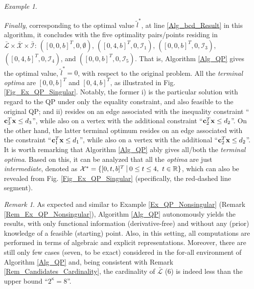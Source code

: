 \documentclass[9pt,twocolumn,twoside,lineno]{pnas-new-1}
\newcommand{\bfc}{{\bf c}}
\newcommand{\bfx}{{\bf x}}
\newcommand{\real}{\mathbb{R}}
\newcommand{\calI}{{\mathcal I}}
\newcommand{\calL}{{\mathcal L}}
\newcommand{\calX}{{\mathcal X}}
\theoremstyle{remark}
\newtheorem{remark}{Remark}[section]
\newtheorem{example}{Example}[section]
\begin{document}
\begin{example}
\begin{enumerate}
\end{enumerate}

\textit{Finally}, corresponding to the optimal value $\tilde l^*$, at line \ref{Alg_bcd_Result} in this algorithm, it concludes with the five optimality pairs/points residing in $\bar\calL\times\bar\calX\times\bar\calI$: $([0,0,b]^T,0,\emptyset)$, $([0,4,b]^T,0,\calI_1)$, $([0,0,b]^T,0,\calI_3)$, $([0,4,b]^T,0,\calI_4)$, and $([0,0,b]^T,0,\calI_5)$. That is, Algorithm \ref{Alg_QP} gives the optimal value, $\tilde l^*=0$, with respect to the original problem. All the \textit{terminal optima} are $[0,0,b]^T$ and $[0,4,b]^T$, as illustrated in Fig. \ref{Fig_Ex_QP_Singular}. Notably, the former i) is the particular solution with regard to the QP under only the equality constraint, and also feasible to the original QP; and ii) resides on an edge associated with the inequality constraint ``$\bfc_3^T\bfx\le d_3$'', while also on a vertex with the additional constraint ``$\bfc_2^T\bfx\le d_2$''. On the other hand, the latter terminal optimum resides on an edge associated with the constraint ``$\bfc_1^T\bfx\le d_1$'', while also on a vertex with the additional ``$\bfc_2^T\bfx\le d_2$''. It is worth remarking that Algorithm \ref{Alg_QP} ably gives all/both the \textit{terminal optima}. Based on this, it can be analyzed that all the \textit{optima} are just \textit{intermediate}, denoted as $\calX^*=\{[0,t,b]^T~\vrule~0\le t\le 4,~t\in\real\}$, which can also be revealed from Fig. \ref{Fig_Ex_QP_Singular} (specifically, the red-dashed line segment).

\begin{remark}
As expected and similar to Example \ref{Ex_QP_Nonsingular} (Remark \ref{Rem_Ex_QP_Nonsingular}), Algorithm \ref{Alg_QP} autonomously yields the results, with only functional information (derivative-free) and without any (prior) knowledge of a feasible (starting) point. Also, in this setting, all computations are performed in terms of algebraic and explicit representations. Moreover, there are still only few cases (seven, to be exact) considered in the for-all environment of Algorithm \ref{Alg_QP} and, being consistent with Remark \ref{Rem_Candidates_Cardinality}, the cardinality of $\bar\calL$ (6) is indeed less than the upper bound ``$2^\kappa=8$''.
\end{remark}

\label{Ex_QP_Singular}
\end{example}
\end{document}

